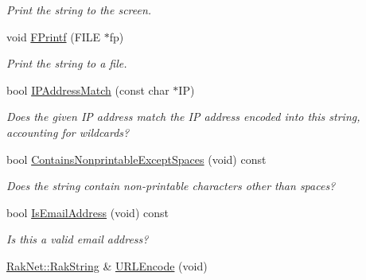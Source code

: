 \begin{DoxyCompactItemize}
\begin{DoxyCompactList}\small\item\em Print the string to the screen. \end{DoxyCompactList}\item 
\hypertarget{class_rak_net_1_1_rak_string_a7ac08e9f5665fa91f3aab69b503046d6}{void \hyperlink{class_rak_net_1_1_rak_string_a7ac08e9f5665fa91f3aab69b503046d6}{F\-Printf} (F\-I\-L\-E $\ast$fp)}\label{class_rak_net_1_1_rak_string_a7ac08e9f5665fa91f3aab69b503046d6}

\begin{DoxyCompactList}\small\item\em Print the string to a file. \end{DoxyCompactList}\item 
\hypertarget{class_rak_net_1_1_rak_string_a26660f0a5bc671d66825963c95e689b2}{bool \hyperlink{class_rak_net_1_1_rak_string_a26660f0a5bc671d66825963c95e689b2}{I\-P\-Address\-Match} (const char $\ast$I\-P)}\label{class_rak_net_1_1_rak_string_a26660f0a5bc671d66825963c95e689b2}

\begin{DoxyCompactList}\small\item\em Does the given I\-P address match the I\-P address encoded into this string, accounting for wildcards? \end{DoxyCompactList}\item 
\hypertarget{class_rak_net_1_1_rak_string_ad8676d5e5bcec7c625745710ad03b680}{bool \hyperlink{class_rak_net_1_1_rak_string_ad8676d5e5bcec7c625745710ad03b680}{Contains\-Nonprintable\-Except\-Spaces} (void) const }\label{class_rak_net_1_1_rak_string_ad8676d5e5bcec7c625745710ad03b680}

\begin{DoxyCompactList}\small\item\em Does the string contain non-\/printable characters other than spaces? \end{DoxyCompactList}\item 
\hypertarget{class_rak_net_1_1_rak_string_aed2f7cfdfd65f63a3e6f7fdf28930f7e}{bool \hyperlink{class_rak_net_1_1_rak_string_aed2f7cfdfd65f63a3e6f7fdf28930f7e}{Is\-Email\-Address} (void) const }\label{class_rak_net_1_1_rak_string_aed2f7cfdfd65f63a3e6f7fdf28930f7e}

\begin{DoxyCompactList}\small\item\em Is this a valid email address? \end{DoxyCompactList}\item 
\hypertarget{class_rak_net_1_1_rak_string_aac87f8015d01c5c973c259066d96b4f0}{\hyperlink{class_rak_net_1_1_rak_string}{Rak\-Net\-::\-Rak\-String} \& \hyperlink{class_rak_net_1_1_rak_string_aac87f8015d01c5c973c259066d96b4f0}{U\-R\-L\-Encode} (void)}\label{class_rak_net_1_1_rak_string_aac87f8015d01c5c973c259066d96b4f0}


\end{DoxyCompactItemize}
